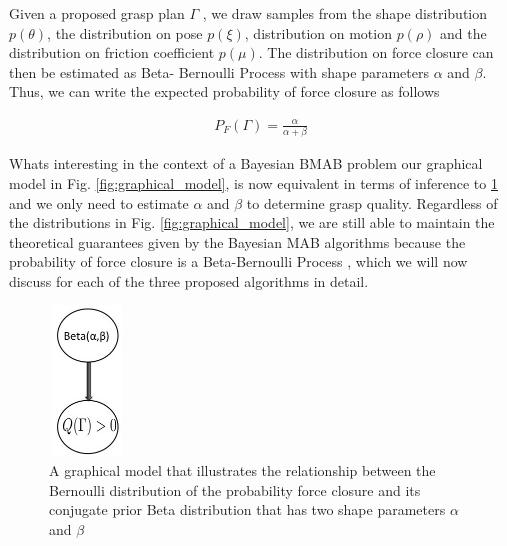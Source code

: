 \documentclass[journal,transmag]{IEEEtran}%
\begin{document}
Given a proposed grasp plan $\Gamma$ , we draw samples from the shape distribution $p(\theta)$, the distribution on pose $p(\xi)$, distribution on motion $p(\rho)$ and the distribution on friction coefficient $p(\mu)$.
The distribution on force closure can then be estimated as Beta- Bernoulli Process with shape parameters $\alpha$ and $\beta$.
Thus, we can write the expected probability of force closure as follows

\vspace{-2ex}
\begin{align}\label{eq:shape_sampling}
P_F(\Gamma) = \frac{\alpha}{\alpha + \beta}
\end{align}

Whats interesting in the context of a Bayesian BMAB problem our graphical model in Fig. \ref{fig:graphical_model}, is now equivalent in terms of inference to \ref{fig:beta_model} and we only need to estimate $\alpha$ and $\beta$ to determine grasp quality. Regardless of the distributions in Fig. \ref{fig:graphical_model}, we are still able to maintain the theoretical guarantees given by the Bayesian MAB algorithms because the probability of force closure is a Beta-Bernoulli Process \cite{agrawal2011analysis} \cite{kaufmann2012bayesian} 
\cite{weber1992gittins}, which we will now discuss for each of the three proposed algorithms in detail. 


\begin{figure}[ht!]
\centering
\includegraphics[width = 2cm, height = 4cm]{figures/Slide9.jpg}
\caption{A graphical model that illustrates the relationship between the Bernoulli distribution of the probability force closure and its conjugate prior Beta distribution that has two shape parameters $\alpha$ and $\beta$ }
\vspace*{-10pt}
\label{fig:beta_model}
\end{figure}


\end{document}

